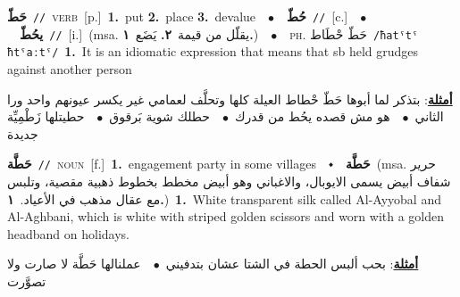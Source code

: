 \documentclass[10pt,a4paper,twoside]{article} %
\begin{document}
\begin{multicols}{2}
{\setlength\topsep{0pt}\textbf{\foreignlanguage{arabic}{حَطّ}}\ {\color{gray}\texttt{//}\color{black}}\ \textsc{verb}\ [p.]\ \textbf{1.}~put  \textbf{2.}~place  \textbf{3.}~devalue\ \ $\bullet$\ \ \setlength\topsep{0pt}\textbf{\foreignlanguage{arabic}{حُطّ}}\ {\color{gray}\texttt{//}\color{black}}\ [c.]\ \ $\bullet$\ \ \setlength\topsep{0pt}\textbf{\foreignlanguage{arabic}{يحُطّ}}\ {\color{gray}\texttt{//}\color{black}}\ [i.]\ \color{gray}(msa. \foreignlanguage{arabic}{يقلّل من قيمة}~\foreignlanguage{arabic}{\textbf{٢.}}  \foreignlanguage{arabic}{يَضَع}~\foreignlanguage{arabic}{\textbf{١.}})\color{black}\ \ $\bullet$\ \ \textsc{ph.} \color{gray} \foreignlanguage{arabic}{حَطّ حْطَاط}\color{black}\ {\color{gray}\texttt{/{\sffamily ħatˤtˤ ħtˤaːtˤ}/}\color{black}}\ \textbf{1.}~It is an idiomatic expression that means that sb held grudges against another person\  \begin{flushright}\color{gray}\foreignlanguage{arabic}{\textbf{\underline{\foreignlanguage{arabic}{أمثلة}}}: بتذكر لما أبوها حَطّ حْطاط العيلة كلها وتحلَّف لعمامي غير يكسر عيونهم واحد ورا الثاني\ $\bullet$\ \  هو مش قصده يحُط من قدرك\ $\bullet$\ \  حطلك شوية بَرقوق\ $\bullet$\ \  حطيتلها زَطْمِيِّة جديدة}\end{flushright}\color{black}} \vspace{2mm}

{\setlength\topsep{0pt}\textbf{\foreignlanguage{arabic}{حَطَّة}}\ {\color{gray}\texttt{//}\color{black}}\ \textsc{noun}\ [f.]\ \textbf{1.}~engagement party in some villages\ \ $\smblkdiamond$\ \ \setlength\topsep{0pt}\textbf{\foreignlanguage{arabic}{حَطَّة}}\ \color{gray}(msa. \foreignlanguage{arabic}{حرير شفاف أبيض يسمى الايوبال، والاغباني وهو أبيض مخطط بخطوط ذهبية مقصية، وتلبس مع عقال مذهب في الأعياد.}~\foreignlanguage{arabic}{\textbf{١.}})\color{black}\ \textbf{1.}~White transparent silk called Al-Ayyobal and Al-Aghbani, which is white with striped golden scissors and worn with a golden headband on holidays.\  \begin{flushright}\color{gray}\foreignlanguage{arabic}{\textbf{\underline{\foreignlanguage{arabic}{أمثلة}}}: بحب ألبس الحطة في الشتا عشان بتدفيني\ $\bullet$\ \  عملنالها حَطَّة لا صارت ولا تصوَّرت}\end{flushright}\color{black}} \vspace{2mm}


\end{multicols}
\end{document}
